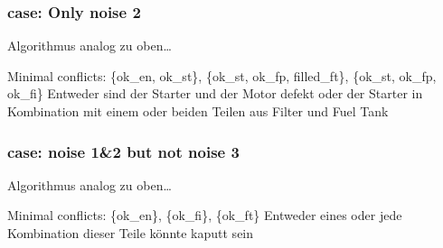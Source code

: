 \documentclass[]{article}
\begin{document}
\subsubsection{case: Only noise 2}
Algorithmus analog zu oben\ldots{}

Minimal conflicts: \{ok\_en, ok\_st\}, \{ok\_st, ok\_fp, filled\_ft\},
\{ok\_st, ok\_fp, ok\_fi\} Entweder sind der Starter und der Motor
defekt oder der Starter in Kombination mit einem oder beiden Teilen aus
Filter und Fuel Tank

\subsubsection{case: noise 1\&2 but not noise 3}
Algorithmus analog zu oben\ldots{}

Minimal conflicts: \{ok\_en\}, \{ok\_fi\}, \{ok\_ft\} Entweder eines
oder jede Kombination dieser Teile könnte kaputt sein
\end{document}
